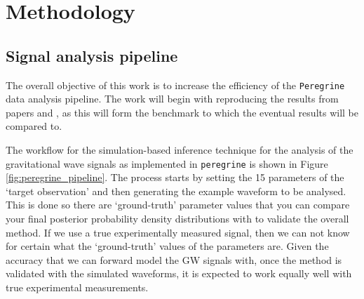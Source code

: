 \section{Methodology}
\label{sec:methodology}

\subsection{Signal analysis pipeline}

The overall objective of this work is to increase the efficiency of the \texttt{Peregrine} data analysis pipeline. The work will begin with reproducing the results from papers \cite{bhardwaj2023peregrine} and \cite{alvey2023things}, as this will form the benchmark to which the eventual results will be compared to.

The workflow for the simulation-based inference technique for the analysis of the gravitational wave signals as implemented in \texttt{peregrine} \cite{bhardwaj2023peregrine} is shown in Figure \ref{fig:peregrine_pipeline}. The process starts by setting the 15 parameters of the `target observation' and then generating the example waveform to be analysed. This is done so there are `ground-truth' parameter values that you can compare your final posterior probability density distributions with to validate the overall method. If we use a true experimentally measured signal, then we can not know for certain what the `ground-truth' values of the parameters are. Given the accuracy that we can forward model the GW signals with, once the method is validated with the simulated waveforms, it is expected to work equally well with true experimental measurements.

